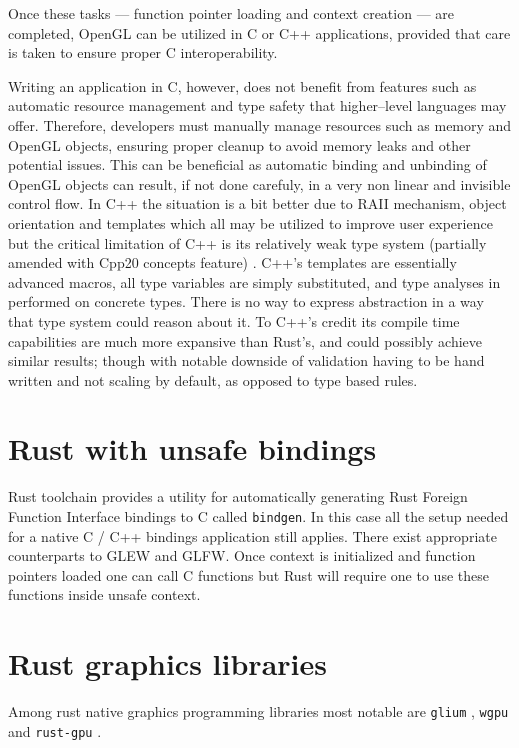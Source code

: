 Once these tasks --- function pointer loading and context creation --- are completed, OpenGL can be utilized in C or C++ applications, provided that care is taken to ensure proper C interoperability. 

Writing an application in C, however, does not benefit from features such as automatic resource management and type safety that higher--level languages may offer.
Therefore, developers must manually manage resources such as memory and OpenGL objects, ensuring proper cleanup to avoid memory leaks and other potential issues.
This can be beneficial as automatic binding and unbinding of OpenGL objects can result, if not done carefuly, in a very non linear and invisible control flow.
In C++ the situation is a bit better due to RAII mechanism, object orientation and templates which all may be utilized to improve user experience but the
critical limitation of C++ is its relatively weak type system (partially amended with Cpp20 concepts feature) \cite{cppref}.
C++'s templates are essentially advanced macros, all type variables are simply substituted, and type analyses in performed on concrete types.
There is no way to express abstraction in a way that type system could reason about it.
To C++'s credit its compile time capabilities are much more expansive than Rust's, and could possibly achieve similar results; 
though with notable downside of validation having to be hand written and not scaling by default, as opposed to type based rules.

\section{Rust with unsafe bindings}

Rust toolchain provides a utility for automatically generating Rust Foreign Function Interface bindings to C called \texttt{bindgen}.
In this case all the setup needed for a native C / C++ bindings application still applies. There exist appropriate counterparts to GLEW and GLFW.
Once context is initialized and function pointers loaded one can call C functions but Rust will require one to use these functions inside unsafe context.

\section{Rust graphics libraries}

Among rust native graphics programming libraries most notable are \texttt{glium} \cite{gliumgithub}, \texttt{wgpu} \cite{wgpugithub} and \texttt{rust-gpu} \cite{rustgpugithub}.


